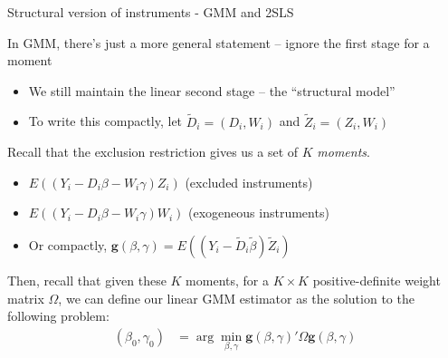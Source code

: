 \documentclass[notes,11pt, aspectratio=169]{beamer}
\newenvironment{wideitemize}{\itemize\addtolength{\itemsep}{10pt}}{\enditemize}
\begin{document}
\begin{frame}{Structural version of instruments - GMM and 2SLS}
  \begin{wideitemize}
  \item   In GMM, there's just a more general statement -- ignore the first stage for a moment
    \begin{itemize}
    \item We still maintain the linear second stage -- the
      ``structural model''
    \item To write this compactly, let $\widetilde{D}_{i} = (D_{i}, W_{i})$ and $\widetilde{Z}_{i} = (Z_{i}, W_{i})$
    \end{itemize}
  \item Recall that the exclusion restriction gives us a set of $K$ \emph{moments}. 
    \begin{itemize}
    \item $E((Y_{i} - D_{i}\beta - W_{i}\gamma)Z_{i})$ (excluded instruments)
    \item $E((Y_{i} - D_{i}\beta - W_{i}\gamma)W_{i})$ (exogeneous instruments)
    \item Or compactly,
      $\mathbf{g}(\beta, \gamma) = E((Y_{i} -
      \widetilde{D}_{i}\widetilde{\beta})\widetilde{Z}_{i})$
    \end{itemize}
  \item Then, recall that given these $K$ moments, for a $K \times K$
    positive-definite weight matrix $\Omega$, we can define our linear GMM
    estimator as the solution to the following problem:
    \begin{align}
      (\beta_{0}, \gamma_{0}) &= \arg\min_{\beta, \gamma} \mathbf{g}(\beta, \gamma)' \Omega \mathbf{g}(\beta, \gamma)
    \end{align}
  \end{wideitemize}
\end{frame}
\end{document}
